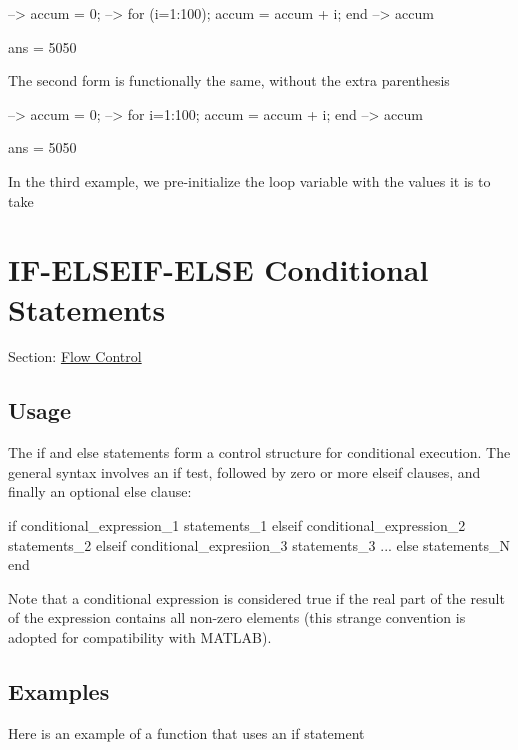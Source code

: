 \begin{DoxyVerbInclude}
--> accum = 0;
--> for (i=1:100); accum = accum + i; end
--> accum

ans = 
 5050 
\end{DoxyVerbInclude}


The second form is functionally the same, without the extra parenthesis


\begin{DoxyVerbInclude}
--> accum = 0;
--> for i=1:100; accum = accum + i; end
--> accum

ans = 
 5050 
\end{DoxyVerbInclude}


In the third example, we pre-\/initialize the loop variable with the values it is to take


\begin{DoxyVerbInclude}

\end{DoxyVerbInclude}
 \hypertarget{flow_if}{}\section{I\-F-\/\-E\-L\-S\-E\-I\-F-\/\-E\-L\-S\-E Conditional Statements}\label{flow_if}
Section\-: \hyperlink{sec_flow}{Flow Control} \hypertarget{vtkwidgets_vtkxyplotwidget_Usage}{}\subsection{Usage}\label{vtkwidgets_vtkxyplotwidget_Usage}
The {\ttfamily if} and {\ttfamily else} statements form a control structure for conditional execution. The general syntax involves an {\ttfamily if} test, followed by zero or more {\ttfamily elseif} clauses, and finally an optional {\ttfamily else} clause\-: \begin{DoxyVerb}  if conditional_expression_1
    statements_1
  elseif conditional_expression_2
    statements_2
  elseif conditional_expresiion_3
    statements_3
  ...
  else
    statements_N
  end
\end{DoxyVerb}
 Note that a conditional expression is considered true if the real part of the result of the expression contains all non-\/zero elements (this strange convention is adopted for compatibility with M\-A\-T\-L\-A\-B). \hypertarget{variables_matrix_Examples}{}\subsection{Examples}\label{variables_matrix_Examples}
Here is an example of a function that uses an {\ttfamily if} statement


